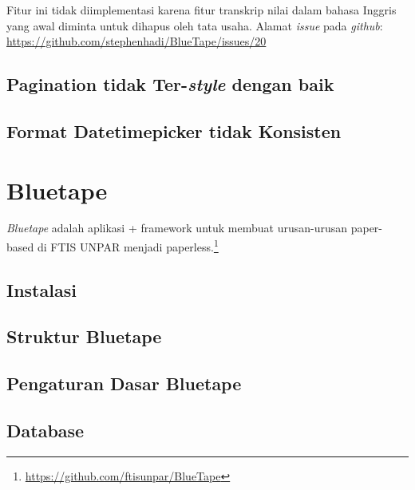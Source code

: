 Fitur ini tidak diimplementasi karena fitur transkrip nilai dalam bahasa Inggris yang awal diminta untuk dihapus oleh tata usaha. Alamat \textit{issue} pada \textit{github}: \url{https://github.com/stephenhadi/BlueTape/issues/20} 
\subsection{Pagination tidak Ter-\textit{style} dengan baik}
\label{issue:22}
\subsection{Format Datetimepicker tidak Konsisten}
\label{issue:23}

\section{Bluetape}

\textit{Bluetape} adalah aplikasi + framework untuk membuat urusan-urusan paper-based di FTIS UNPAR menjadi paperless.\footnote{\url{https://github.com/ftisunpar/BlueTape}}

\subsection{Instalasi}

\subsection{Struktur Bluetape}

\subsection{Pengaturan Dasar Bluetape}

\subsection{Database}